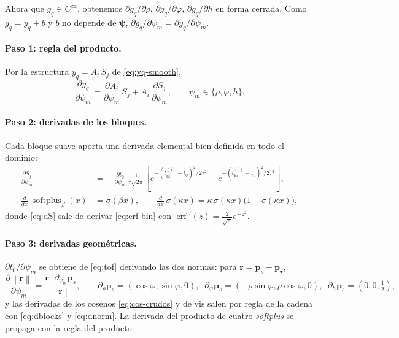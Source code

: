 \documentclass[11pt,a4paper]{article}
\theoremstyle{plain}
\theoremstyle{definition}
\newcommand{\vect}[1]{\boldsymbol{#1}}
\newcommand{\softplus}{\operatorname{softplus}}
\newcommand{\erf}{\operatorname{erf}}
\newcommand{\norm}[1]{\left\lVert #1 \right\rVert}
\begin{document}
Ahora que $g_q\in C^\infty$, obtenemos $\partial g_q/\partial\rho$,
$\partial g_q/\partial\varphi$, $\partial g_q/\partial h$ en forma cerrada. Como
$g_q=y_q+b$ y $b$ no depende de $\vect{\psi}$,
$\partial g_q/\partial\psi_m=\partial y_q/\partial\psi_m$.

\paragraph{Paso 1: regla del producto.} Por la estructura $y_q=A_i\,S_j$ de
\eqref{eq:yq-smooth},
\begin{equation}
    \frac{\partial y_q}{\partial\psi_m}
    =\frac{\partial A_i}{\partial\psi_m}\,S_j
    +A_i\,\frac{\partial S_j}{\partial\psi_m},
    \qquad \psi_m\in\{\rho,\varphi,h\}.
    \label{eq:chain}
\end{equation}

\paragraph{Paso 2: derivadas de los bloques.} Cada bloque suave aporta una
derivada elemental bien definida en todo el dominio:
\begin{align}
    \frac{\partial S_j}{\partial\psi_m}
    &=-\,\frac{\partial t_0}{\partial\psi_m}\,
    \frac{1}{\tau\sqrt{2\pi}}
    \left[
        e^{-(t^{(j)}_{\mathrm{hi}}-t_0)^2/2\tau^2}
        -e^{-(t^{(j)}_{\mathrm{lo}}-t_0)^2/2\tau^2}
    \right],
    \label{eq:dS}\\[4pt]
    \frac{d}{dx}\,\softplus_\beta(x)&=\sigma(\beta x),
    \qquad
    \frac{d}{dx}\,\sigma(\kappa x)=\kappa\,\sigma(\kappa x)\bigl(1-\sigma(\kappa x)\bigr),
    \label{eq:dblocks}
\end{align}
donde \eqref{eq:dS} sale de derivar \eqref{eq:erf-bin} con
$\erf'(z)=\tfrac{2}{\sqrt\pi}e^{-z^2}$.

\paragraph{Paso 3: derivadas geom\'etricas.} $\partial t_0/\partial\psi_m$ se
obtiene de \eqref{eq:tof} derivando las dos normas: para $\vect r=\vect p_s-\vect
p_\bullet$,
\begin{equation}
    \frac{\partial\norm{\vect r}}{\partial\psi_m}
    =\frac{\vect r\cdot\partial_{\psi_m}\vect p_s}{\norm{\vect r}},
    \qquad
    \partial_\rho\vect p_s=(\cos\varphi,\sin\varphi,0),\;\;
    \partial_\varphi\vect p_s=(-\rho\sin\varphi,\rho\cos\varphi,0),\;\;
    \partial_h\vect p_s=(0,0,\tfrac12),
    \label{eq:dnorm}
\end{equation}
y las derivadas de los cosenos \eqref{eq:cos-crudos} y de $\mathrm{vis}$ salen por
regla de la cadena con \eqref{eq:dblocks} y \eqref{eq:dnorm}. La derivada del
producto de cuatro \emph{softplus} se propaga con la regla del producto.
\end{document}

